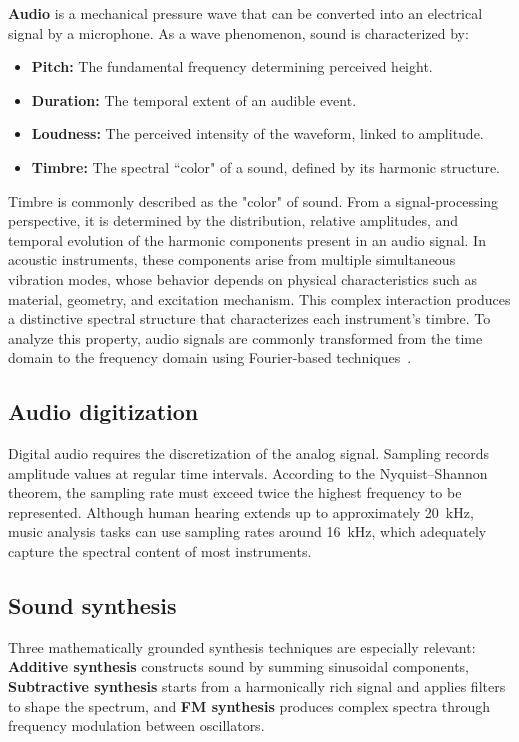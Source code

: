 \documentclass[10pt,conference]{IEEEtran}
\begin{document}
\textbf{Audio} is a mechanical pressure wave that can be converted into an electrical signal by a microphone. As a wave phenomenon, sound is characterized by:

\begin{itemize}
    \item \textbf{Pitch:} The fundamental frequency determining perceived height.
    \item \textbf{Duration:} The temporal extent of an audible event.
    \item \textbf{Loudness:} The perceived intensity of the waveform, linked to amplitude.
    \item \textbf{Timbre:} The spectral “color" of a sound, defined by its harmonic structure.
\end{itemize}

Timbre is commonly described as the "color" of sound. From a signal-processing perspective, it is determined by the distribution, relative amplitudes, and temporal evolution of the harmonic components present in an audio signal. In acoustic instruments, these components arise from multiple simultaneous vibration modes, whose behavior depends on physical characteristics such as material, geometry, and excitation mechanism. This complex interaction produces a distinctive spectral structure that characterizes each instrument’s timbre. To analyze this property, audio signals are commonly transformed from the time domain to the frequency domain using Fourier-based techniques~\cite{benson2008music}.

\subsection{Audio digitization}

Digital audio requires the discretization of the analog signal. Sampling \cite{po2022sampling} records amplitude values at regular time intervals. According to the Nyquist–Shannon theorem, the sampling rate must exceed twice the highest frequency to be represented. Although human hearing extends up to approximately 20~kHz, music analysis tasks can use sampling rates around 16~kHz, which adequately capture the spectral content of most instruments.

\subsection{Sound synthesis}

Three mathematically grounded synthesis techniques are especially relevant: \textbf{Additive synthesis} constructs sound by summing sinusoidal components, \textbf{Subtractive synthesis} starts from a harmonically rich signal and applies filters to shape the spectrum, and \textbf{FM synthesis} produces complex spectra through frequency modulation between oscillators.
\end{document}
